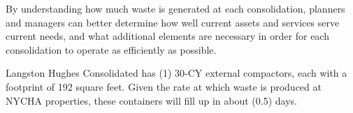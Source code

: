 
    By understanding how much waste is generated at each consolidation, planners and managers
    can better determine how well current assets and services serve current needs, and what additional 
    elements are necessary in order for each consolidation to operate as efficiently as possible. 

    Langston Hughes Consolidated has (1) 30-CY external compactors, each with a footprint of 192 square feet. Given the rate at which waste is produced at NYCHA properties, these containers will fill
    up in about (0.5) days.